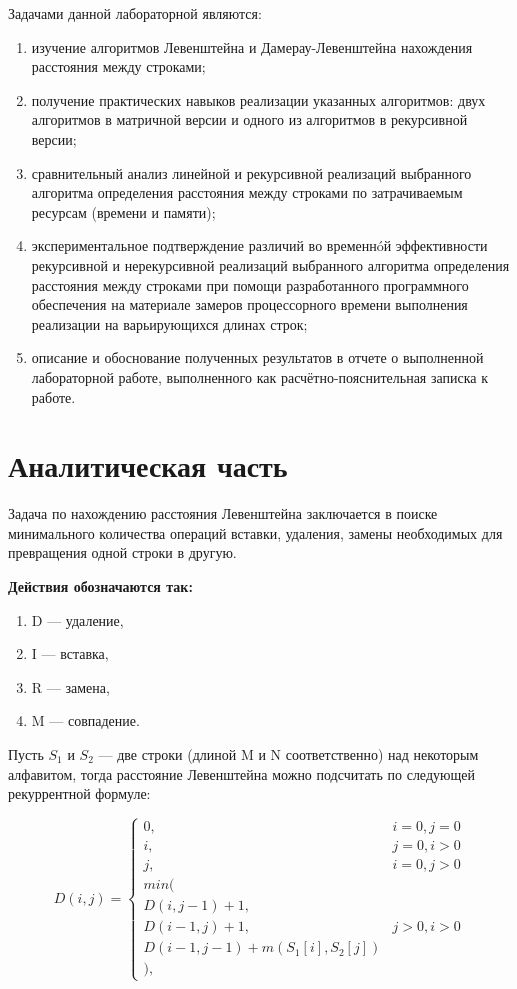 \documentclass[12pt]{report}
\begin{document}
Задачами данной лабораторной являются:
\begin{enumerate}
  	\item изучение алгоритмов Левенштейна и Дамерау-Левенштейна нахождения расстояния между строками;
	\item получение практических навыков реализации указанных алгоритмов: двух алгоритмов в матричной версии и одного из алгоритмов в рекурсивной версии; 
	\item сравнительный анализ линейной и рекурсивной реализаций выбранного алгоритма определения расстояния между строками по затрачиваемым ресурсам (времени и памяти); 
	\item экспериментальное подтверждение различий во временнóй эффективности рекурсивной и
нерекурсивной реализаций выбранного алгоритма определения расстояния между строками при
помощи разработанного программного обеспечения на материале замеров процессорного времени
выполнения реализации на варьирующихся длинах строк; 
	\item описание и обоснование полученных результатов в отчете о выполненной лабораторной
работе, выполненного как расчётно-пояснительная записка к работе. 
\end{enumerate}


\chapter{Аналитическая часть}
Задача по нахождению расстояния Левенштейна заключается в поиске минимального количества операций вставки, удаления, замены необходимых для превращения одной строки в другую.
 
\textbf{Действия обозначаются так:} 
\begin{enumerate}
  	\item D — удаление,
	\item I  — вставка,
	\item R  — замена,
	\item M — совпадение.
\end{enumerate}

Пусть $S_{1}$ и $S_{2}$ — две строки (длиной M и N соответственно) над некоторым алфавитом, тогда расстояние Левенштейна можно подсчитать по следующей рекуррентной формуле:

\begin{displaymath}
D(i,j) = \left\{ \begin{array}{ll}
 0, & \textrm{$i = 0, j = 0$}\\
 i, & \textrm{$j = 0, i > 0$}\\
 j, & \textrm{$i = 0, j > 0$}\\
min(\\
D(i,j-1)+1,\\
D(i-1, j) +1, &\textrm{$j>0, i>0$}\\
D(i-1, j-1) + m(S_{1}[i], S_{2}[j])\\
),
  \end{array} \right.
\end{displaymath}
\end{document}
